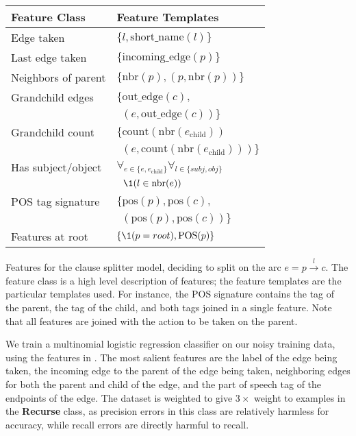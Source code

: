 \begin{table}
\begin{center}
\begin{tabular}{ll}
  \textbf{Feature Class} & \textbf{Feature Templates} \\
  \hline
  Edge taken          & $\{ l, \textrm{short\_name}(l) \}$ \\
  Last edge taken     & $\{ \textrm{incoming\_edge}(p) \}$ \\
  Neighbors of parent & $\{ \textrm{nbr}(p), (p, \textrm{nbr}(p)) \}$ \\
  Grandchild edges    & $\{ \textrm{out\_edge}(c), $ \\
                      & $~~ (e, \textrm{out\_edge}(c)) \}$ \\
  Grandchild count    & $\{ \textrm{count}\left( \textrm{nbr}(e_\textrm{child}) \right) $ \\
                      & $~~ \left(e, \textrm{count}\left( \textrm{nbr}(e_\textrm{child}) \right) \right) \}$ \\
  Has subject/object  & $\forall_{e \in \{e, e_\textrm{child}\}} \forall_{l \in \{\textit{subj}, \textit{obj}\}} $ \\
                      & $~~ \1(l \in \textrm{nbr}(e)) $ \\
  POS tag signature   & $\{ \textrm{pos}(p), \textrm{pos}(c), $ \\
                      & $~~ \left( \textrm{pos}(p), \textrm{pos}(c) \right) \}$ \\
  Features at root    & $\{ \1(p = root), \textrm{POS}(p) \}$
\end{tabular}
\end{center}
{\label{tab:features}
Features for the clause splitter model, deciding to split on the arc
  $e = p \xrightarrow{l} c$.
The feature class is a high level description of features; the feature
  templates are the particular templates used.
For instance, the POS signature contains the tag of the parent, the tag of
  the child, and both tags joined in a single feature.
Note that all features are joined with the action to be taken on the parent.
}
\end{table}

We train a multinomial logistic regression classifier on our noisy
  training data, using the features in .
The most salient features are the label of the edge being taken, the
  incoming edge to the parent of the edge being taken, neighboring edges
  for both the parent and child of the edge, and the part of speech tag of
  the endpoints of the edge.
The dataset is weighted to give $3\times$ weight to examples in the \textbf{Recurse}
  class, as precision errors in this class are relatively harmless for accuracy,
  while recall errors are directly harmful to recall.

